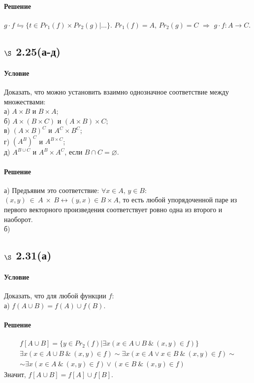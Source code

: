 \documentclass[a4paper,12pt]{article}
\begin{document}
\paragraph*{Решение}
$g\cdot f \leftrightharpoons \{t\in Pr_1(f)\times Pr_2(g)| ...\}$. $Pr_1(f)=A$, $Pr_2(g)=C$ $\Rightarrow$ $g \cdot f: A\to C$. 


\subsection*{$\S$ 2.25(а-д)}
\paragraph*{Условие}
Доказать, что можно установить взаимно однозначное соответствие между множествами:\\
а) $A\times B$ и $B\times A$;\\
б) $A\times (B\times C)$ и $(A\times B)\times C$;\\
в) $(A\times B)^C$ и $A^C\times B^C$;\\
г) $(A^B)^C$ и $A^{B\times C}$;\\
д) $A^{B\cup C}$ и $A^B\times A^C$, если $B\cap C = \varnothing$.
\paragraph*{Решение}
а) Предъявим это соответствие: $\forall x\in A$, $y\in B:$ $(x,y)~\in~A~\times~B \leftrightarrow (y,x)\in B\times A$, то есть любой упорядоченной паре из первого векторного произведения соответствует ровно одна из второго и наоборот.\\
б)

\subsection*{$\S$ 2.31(а)}
\paragraph*{Условие}
Доказать, что для любой функции $f$: \\
а) $f(A\cup B) = f(A)\cup f(B)$.
\paragraph*{Решение}
\begin{gather*}
f[A\cup B] = \{y\in Pr_2(f)|\exists x(x\in A\cup B \ \& \ (x,y)\in f)\} \\
\exists x(x\in A\cup B\ \& \ (x,y)\in f) \sim \exists x(x\in A \vee x\in B \ \& \ (x,y)\in f)  \sim \\
\sim \exists x(x\in A \ \& \ (x,y)\in f) \vee (x\in B \ \& \ (x,y)\in f)
\end{gather*}
Значит, $f[A\cup B] = f[A] \cup f[B]$.
\end{document}
